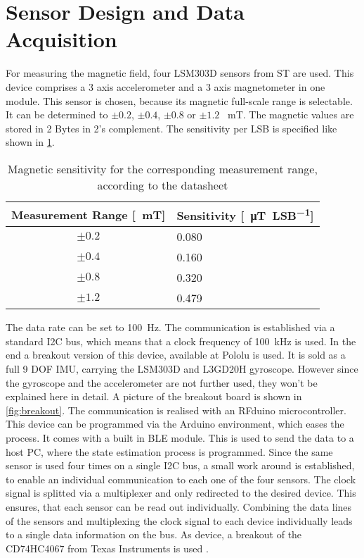 \section{Sensor Design and Data Acquisition} \label{cha:sensors}

For measuring the magnetic field, four LSM303D sensors \cite{STlsm2012} from ST are used. This device comprises a 3 axis accelerometer and a 3 axis magnetometer in one module. This sensor is chosen, because its magnetic full-scale range is selectable. It can be determined to $ \pm 0.2$, $ \pm 0.4 $, $ \pm 0.8 $ or $ \pm 1.2 $ \SI{}{\milli\tesla}. The magnetic values are stored in 2 Bytes in 2's complement. The sensitivity per \ac{LSB} is specified like shown in \ref{tab:magSensitivity}.

\begin{table}[h]
\centering
\begin{tabular}{|c|l|}
\hline
\textbf{Measurement Range [\SI{}{\milli\tesla}]} & \textbf{Sensitivity [\SI{}{\micro\tesla \per LSB}]} \\ \hline
$ \pm 0.2 $ & 0.080 \\ \hline
$ \pm 0.4 $ & 0.160 \\ \hline
$ \pm 0.8 $ & 0.320 \\ \hline
$ \pm 1.2 $ & 0.479 \\ \hline
\end{tabular}
\caption{Magnetic sensitivity for the corresponding measurement range, according to the datasheet}
\label{tab:magSensitivity}
\end{table}

The data rate can be set to \SI{100}{\Hz}. The communication is established via a standard I2C bus, which means that a clock frequency of \SI{100}{\kilo \Hz} is used. In the end a breakout version of this device, available at Pololu \cite{pol2016} is used. It is sold as a full 9 \ac{DOF} IMU, carrying the LSM303D and L3GD20H gyroscope. However since the gyroscope and the accelerometer are not further used, they won't be explained here in detail. A picture of the breakout board is shown in \ref{fig:breakout}. The communication is realised with an RFduino microcontroller. This device can be programmed via the Arduino environment, which eases the process. It comes with a built in \ac{BLE} module. This is used to send the data to a host PC, where the state estimation process is programmed. Since the same sensor is used four times on a single I2C bus, a small work around is established, to enable an individual communication to each one of the four sensors. The clock signal is splitted via a multiplexer and only redirected to the desired device. This ensures, that each sensor can be read out individually. Combining the data lines of the sensors and multiplexing the clock signal to each device individually leads to a single data information on the bus. As device, a breakout of the CD74HC4067 from Texas Instruments is used \cite{TImux2003}.


